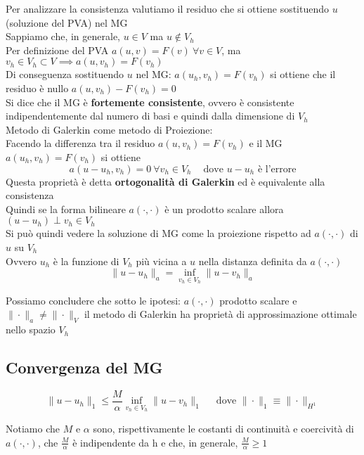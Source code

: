 \documentclass{article}
\begin{document}
Per analizzare la consistenza valutiamo il residuo che si ottiene sostituendo $u$ (soluzione del PVA) nel MG\\
Sappiamo che, in generale, $u\in V$ ma $u\not\in V_h$\\
Per definizione del PVA $a(u,v)=F(v) \ \forall v\in V$, ma $v_h\in V_h\subset V \implies a(u,v_h)=F(v_h)$\\
Di conseguenza sostituendo $u$ nel MG: $a(u_h,v_h)=F(v_h)$ si ottiene che il residuo è nullo $a(u,v_h)-F(v_h)=0$\\

Si dice che il MG è \textbf{fortemente consistente}, ovvero è consistente indipendentemente dal numero di basi e quindi dalla dimensione di $V_h$\\

Metodo di Galerkin come metodo di Proiezione:\\
Facendo la differenza tra il residuo $a(u,v_h)=F(v_h)$ e il MG $a(u_h,v_h)=F(v_h)$ si ottiene
\[
a(u-u_h,v_h)=0 \ \forall v_h\in V_h \ \ \ \ \text{ dove } u-u_h \text{ è l'errore}
\]
Questa proprietà è detta \textbf{ortogonalità di Galerkin} ed è equivalente alla consistenza\\

Quindi se la forma bilineare $a(\cdot,\cdot)$ è un prodotto scalare allora $(u-u_h) \perp v_h\in V_h$\\
Si può quindi vedere la soluzione di MG come la proiezione rispetto ad $a(\cdot,\cdot)$ di $u$ su $V_h$\\
Ovvero $u_h$ è la funzione di $V_h$ più vicina a $u$ nella distanza definita da $a(\cdot,\cdot)$
\[
\|u-u_h\|_{a} = \inf_{v_h\in V_h} \|u-v_h\|_a
\]

Possiamo concludere che sotto le ipotesi: $a(\cdot,\cdot)$ prodotto scalare e $\|\cdot\|_a\ne \|\cdot\|_V$ il metodo di Galerkin ha proprietà di approssimazione ottimale nello spazio $V_h$\\


\newpage
\subsection{Convergenza del MG}


\begin{teo}
    \[
    \|u-u_h\|_1 \le \frac{M}{\alpha} \inf_{v_h\in V_h} \|u-v_h\|_1 \ \ \ \ \ \text{ dove } \|\cdot\|_1 \equiv \|\cdot\|_{H^1}
    \]
\end{teo}

Notiamo che $M$ e $\alpha$ sono, rispettivamente le costanti di continuità e coercività di $a(\cdot,\cdot)$, che $\frac{M}{\alpha}$ è indipendente da h e che, in generale,  $\frac{M}{\alpha}\ge 1$\\
\end{document}

